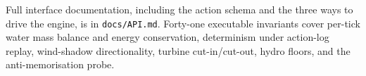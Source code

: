 \documentclass{article}
\begin{document}
Full interface documentation, including the action schema and the three ways to
drive the engine, is in \texttt{docs/API.md}. Forty-one executable invariants
cover per-tick water mass balance and energy conservation, determinism under
action-log replay, wind-shadow directionality, turbine cut-in/cut-out, hydro
floors, and the anti-memorisation probe.



\end{document}
